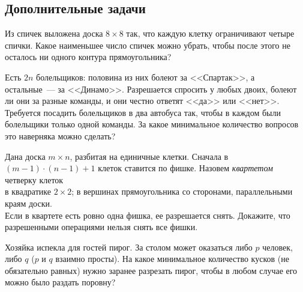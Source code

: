 

\subsection*{Дополнительные задачи}



\begin{problems}

\item
Из спичек выложена доска $8 \times 8$ так, что каждую клетку ограничивают
четыре спички.
Какое наименьшее число спичек можно убрать, чтобы после этого не осталось
ни одного контура прямоугольника?

\item
Есть $2 n$ болельщиков: половина из них болеют за <<Спартак>>, а остальные~---
за <<Динамо>>.
Разрешается спросить у любых двоих, болеют ли они за разные команды, и они
честно ответят <<да>> или <<нет>>.
Требуется посадить болельщиков в два автобуса так, чтобы в каждом были
болельщики только одной команды.
За какое минимальное количество вопросов это наверняка можно сделать?

\item
Дана доска $m \times n$, разбитая на единичные клетки.
Сначала в $(m - 1) \cdot (n - 1) + 1$ клеток ставится по фишке.
Назовем \emph{квартетом} четверку клеток
\\
\subproblem в квадратике $2 \times 2$;
\qquad
\subproblem в вершинах прямоугольника со сторонами, параллельными краям доски.
\\
Если в квартете есть ровно одна фишка, ее разрешается снять.
Докажите, что разрешенными операциями нельзя снять все фишки.

\item
Хозяйка испекла для гостей пирог.
За столом может оказаться либо $p$ человек, либо $q$
($p$ и $q$ взаимно просты).
На какое минимальное количество кусков (не обязательно равных) нужно заранее
разрезать пирог, чтобы в любом случае его можно было раздать поровну?

\end{problems}

